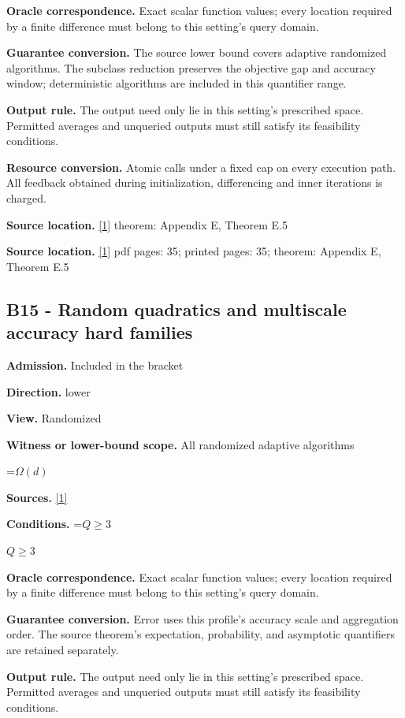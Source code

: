 \documentclass[10pt,a4paper]{article}
\newcommand{\AtlasMath}[1]{\par\begingroup\centering\setbox0=\hbox{$\displaystyle #1$}\ifdim\wd0>1.4\linewidth\typeout{ATLAS WIDE FORMULA: \the\wd0}\fi\ifdim\wd0>\linewidth\resizebox{\linewidth}{!}{\box0}\else\box0\fi\par\endgroup}
\newcommand{\AtlasInlineMath}[1]{\begingroup\setbox0=\hbox{$#1$}\ifdim\wd0>.4\linewidth\endgroup\AtlasMath{#1}\else\endgroup$#1$\fi}
\begin{document}
\textbf{Oracle correspondence.} Exact scalar function values; every location required by a finite difference must belong to this setting's query domain.

\textbf{Guarantee conversion.} The source lower bound covers adaptive randomized algorithms. The subclass reduction preserves the objective gap and accuracy window; deterministic algorithms are included in this quantifier range.

\textbf{Output rule.} The output need only lie in this setting's prescribed space. Permitted averages and unqueried outputs must still satisfy its feasibility conditions.

\textbf{Resource conversion.} Atomic calls under a fixed cap on every execution path. All feedback obtained during initialization, differencing and inner iterations is charged.

\textbf{Source location.} \href{https://arxiv.org/html/2610.00345v1}{[1]} theorem: Appendix E, Theorem E.5

\textbf{Source location.} \href{https://arxiv.org/html/2610.00345v1}{[1]} pdf pages: 35; printed pages: 35; theorem: Appendix E, Theorem E.5

\subsection{B15 - Random quadratics and multiscale accuracy hard families}
\textbf{Admission.} Included in the bracket

\textbf{Direction.} lower

\textbf{View.} Randomized

\textbf{Witness or lower-bound scope.} All randomized adaptive algorithms

\AtlasMath{\Omega(d)}
\textbf{Sources.} \href{https://arxiv.org/html/2610.00345v1}{[1]}

\textbf{Conditions.} \AtlasInlineMath{Q\ge3}

\textbf{Oracle correspondence.} Exact scalar function values; every location required by a finite difference must belong to this setting's query domain.

\textbf{Guarantee conversion.} Error uses this profile's accuracy scale and aggregation order. The source theorem's expectation, probability, and asymptotic quantifiers are retained separately.

\textbf{Output rule.} The output need only lie in this setting's prescribed space. Permitted averages and unqueried outputs must still satisfy its feasibility conditions.
\end{document}
